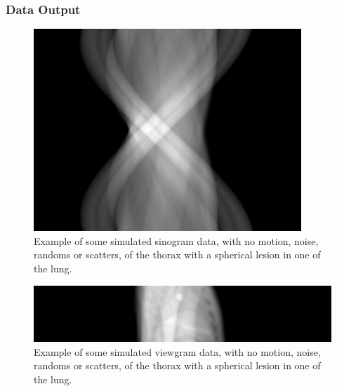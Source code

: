             \subsubsection{Data Output} \label{sec:data_output}
                \begin{figure}
                    \centering
                    
                    \includegraphics[width=1.0\linewidth]{figures/background_sinogram_data_example.png}
                    
                    \captionsetup{singlelinecheck=false, justification=raggedright}
                    \caption{Example of some simulated sinogram data, with no motion, noise, randoms or scatters, of the thorax with a spherical lesion in one of the lung.} \label{fig:data_output_sinogram_data_example}
                \end{figure}
                
                \begin{figure}
                    \centering
                    
                    \includegraphics[width=1.0\linewidth]{figures/background_viewgram_data_example.png}
                    
                    \captionsetup{singlelinecheck=false, justification=raggedright}
                    \caption{Example of some simulated viewgram data, with no motion, noise, randoms or scatters, of the thorax with a spherical lesion in one of the lung.} \label{fig:data_output_viewgram_data_example} %
                \end{figure}
                
